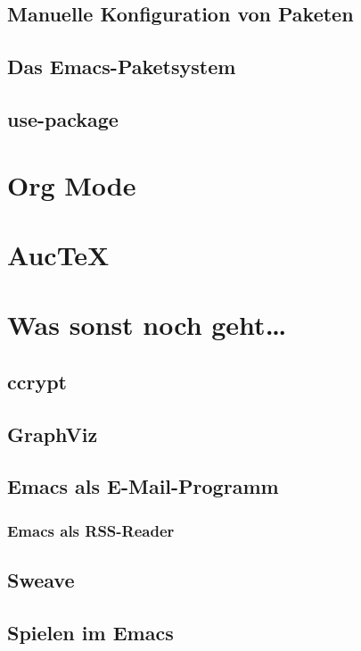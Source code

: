 \documentclass[12pt,ngerman]{scrbook}
\begin{document}
\section{Manuelle Konfiguration von Paketen}

\section{Das Emacs-Paketsystem}

\section{use-package}

\chapter{Org Mode}

\chapter{Auc\TeX}

\chapter{Was sonst noch geht\ldots}

\section{ccrypt}

\section{GraphViz}

\section{Emacs als E-Mail-Programm}

\subsection{Emacs als RSS-Reader}

\section{Sweave}

\section{Spielen im Emacs}\label{sec:spielen}
\end{document}
